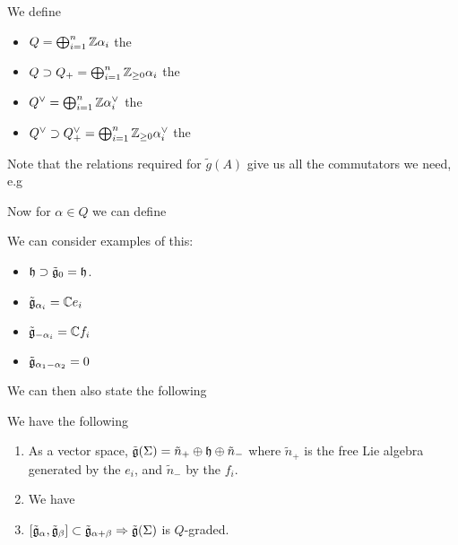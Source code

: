 \documentclass{article}
\begin{document}
\begin{definition}
We define
\begin{itemize}
    \item $Q = \bigoplus_{i=1}^n \mbb{Z}\alpha_i$ the 
    \item $Q \supset Q_+ = \bigoplus_{i=1}^n \mbb{Z}_{\geq 0}\alpha_i$ the 
    \item $Q^\vee = \bigoplus_{i=1}^n \mbb{Z}\alpha^\vee_i$ the 
    \item $Q^\vee \supset Q^\vee_+ = \bigoplus_{i=1}^n \mbb{Z}_{\geq 0}\alpha^\vee_i$ the 
\end{itemize}
\end{definition}

Note that the relations required for $\tilde{g}(A)$ give us all the commutators we need, e.g 
\begin{definition}
Now for $\alpha \in Q$ we can define 
\end{definition}

\begin{example}
We can consider examples of this:
\begin{itemize}
    \item $\mf{h} \supset \tilde{\mf{g}}_0 = \mf{h}$.
    \item $\tilde{\mf{g}}_{\alpha_i} = \mbb{C}e_i$
    \item $\tilde{\mf{g}}_{-\alpha_i} = \mbb{C}f_i$
    \item $\tilde{\mf{g}}_{\alpha_1 - \alpha_2} = 0$
\end{itemize}
\end{example}

We can then also state the following 

\begin{theorem}
We have the following 
\begin{enumerate}
    \item As a vector space, $\tilde{\mf{g}}(\Sigma) = \tilde{n}_+ \oplus \mf{h} \oplus \tilde{n}_-$ where $\tilde{n}_+ $ is the free Lie algebra generated by the $e_i$, and $\tilde{n}_-$ by the $f_i$. 
    \item We have 
\item $\comm[\tilde{\mf{g}}_\alpha]{\tilde{\mf{g}}_\beta}\subset \tilde{\mf{g}}_{\alpha +\beta} \Rightarrow \tilde{\mf{g}}(\Sigma)$ is $Q$-graded. 
\end{enumerate}
\end{theorem}
\end{document}
